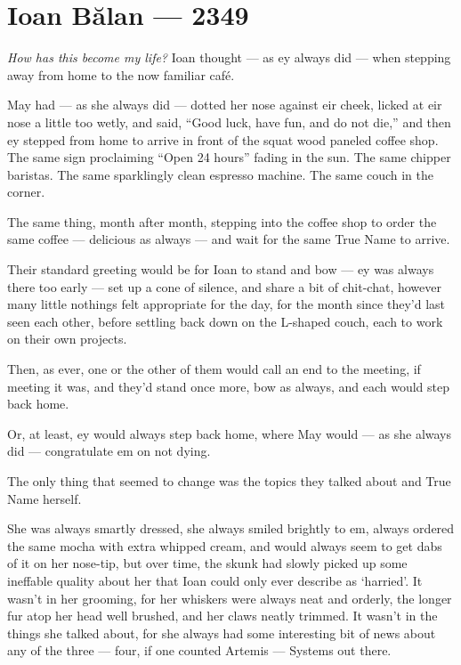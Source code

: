 \hypertarget{ioan-bux103lan-2349}{%
\chapter{Ioan Bălan — 2349}\label{ioan-bux103lan-2349}}

\emph{How has this become my life?} Ioan thought — as ey always did — when stepping away from home to the now familiar café.

May had — as she always did — dotted her nose against eir cheek, licked at eir nose a little too wetly, and said, ``Good luck, have fun, and do not die,'' and then ey stepped from home to arrive in front of the squat wood paneled coffee shop. The same sign proclaiming ``Open 24 hours'' fading in the sun. The same chipper baristas. The same sparklingly clean espresso machine. The same couch in the corner.

The same thing, month after month, stepping into the coffee shop to order the same coffee — delicious as always — and wait for the same True Name to arrive.

Their standard greeting would be for Ioan to stand and bow — ey was always there too early — set up a cone of silence, and share a bit of chit-chat, however many little nothings felt appropriate for the day, for the month since they'd last seen each other, before settling back down on the L-shaped couch, each to work on their own projects.

Then, as ever, one or the other of them would call an end to the meeting, if meeting it was, and they'd stand once more, bow as always, and each would step back home.

Or, at least, ey would always step back home, where May would — as she always did — congratulate em on not dying.

The only thing that seemed to change was the topics they talked about and True Name herself.

She was always smartly dressed, she always smiled brightly to em, always ordered the same mocha with extra whipped cream, and would always seem to get dabs of it on her nose-tip, but over time, the skunk had slowly picked up some ineffable quality about her that Ioan could only ever describe as `harried'. It wasn't in her grooming, for her whiskers were always neat and orderly, the longer fur atop her head well brushed, and her claws neatly trimmed. It wasn't in the things she talked about, for she always had some interesting bit of news about any of the three — four, if one counted Artemis — Systems out there.

